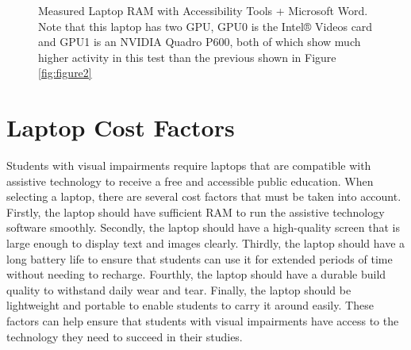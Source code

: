 \begin{figure}[H]
    \hfill
    \caption[Measured Laptop RAM with Accessibility Tools + Microsoft Word]{Measured Laptop RAM with Accessibility Tools + Microsoft Word. Note that this laptop has two GPU, GPU0 is the Intel® Videos card and GPU1 is an NVIDIA Quadro P600, both of which show much higher activity in this test than the previous shown in Figure \ref{fig:figure2}}
    \label{fig:figure3}
\end{figure}

\pagebreak \hypertarget{notes-on-future-proofing-laptops}{}\section{Laptop Cost Factors}\label{notes-on-future-proofing-laptops}
Students with visual impairments require laptops that are compatible with assistive technology to receive a free and accessible public education. When selecting a laptop, there are several cost factors that must be taken into account. Firstly, the laptop should have sufficient RAM to run the assistive technology software smoothly. Secondly, the laptop should have a high-quality screen that is large enough to display text and images clearly. Thirdly, the laptop should have a long battery life to ensure that students can use it for extended periods of time without needing to recharge. Fourthly, the laptop should have a durable build quality to withstand daily wear and tear. Finally, the laptop should be lightweight and portable to enable students to carry it around easily. These factors can help ensure that students with visual impairments have access to the technology they need to succeed in their studies.

